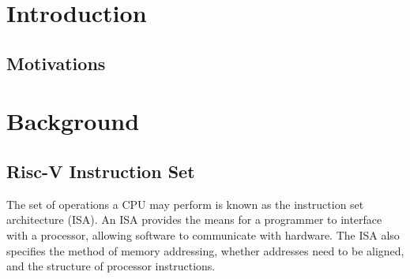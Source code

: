 \documentclass[a4paper,8pt]{report}
\begin{document}
\pagestyle{empty}
\singlespacing

\onehalfspacing

\singlespacing


\setcounter{page}{0}
\pagestyle{plain}
\tableofcontents
\listoffigures
\listoftables

\onehalfspacing


\chapter{Introduction}
\setcounter{page}{1} 
\section{Motivations}









\chapter{Background}
\section{Risc-V Instruction Set}
The set of operations a CPU may perform is known as the instruction set
architecture (ISA). An ISA provides the means for a
programmer to interface with a processor, allowing software to communicate with
hardware. The ISA also specifies the method of memory addressing, whether
addresses need to be aligned, and the structure of processor instructions.
\end{document}

